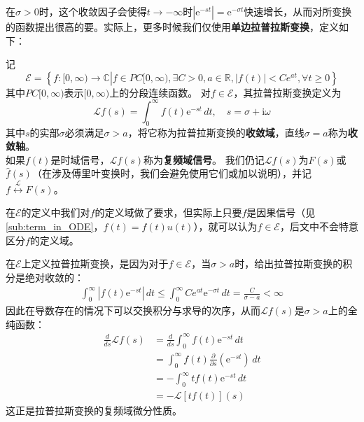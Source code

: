 \documentclass{ctexbook}
\begin{document}
在$\sigma>0$时，这个收敛因子会使得$t\to -\infty$时$|\mathrm{e}^{-st}|=\mathrm{e}^{-\sigma t}$快速增长，从而对所变换的函数提出很高的要。实际上，更多时候我们仅使用\textbf{单边拉普拉斯变换}，定义如下\cite{folland}：
\begin{definition}[单边拉普拉斯变换]
    记\[\mathcal{E}=\left\{f:[0,\infty)\to\mathbb{C}\left|f\in PC[0,\infty),\exists C>0,a\in\mathbb{R},|f(t)|<Ce^{at},\forall t\geq 0\right.\right\}\]
    其中$PC[0,\infty)$表示$[0,\infty)$上的分段连续函数。
    对$f\in\mathcal{E}$，其拉普拉斯变换定义为
    \[\mathcal{L} f(s)=\int_{0}^{\infty}f(t)\mathrm{e}^{-st}\,dt,\quad s=\sigma+\mathrm{i}\omega\]
    其中$s$的实部$\sigma$必须满足$\sigma>a$，将它称为拉普拉斯变换的\textbf{收敛域}，直线$\sigma=a$称为\textbf{收敛轴}。\\
    如果$f(t)$是时域信号，$\mathcal{L} f(s)$称为\textbf{复频域信号}。
    我们仍记$\mathcal{L} f(s)$为$F(s)$或$\hat{f}(s)$（在涉及傅里叶变换时，我们会避免使用它们或加以说明），并记$f\overset{\mathcal{L} }{\longleftrightarrow} F(s)$。
\end{definition}
在$\mathcal{E} $的定义中我们对$f$的定义域做了要求，但实际上只要$f$是因果信号（见\ref{sub:term_in_ODE}，$f(t)=f(t)u(t)$），就可以认为$f\in\mathcal{E}$，后文中不会特意区分$f$的定义域。

在$\mathcal{E} $上定义拉普拉斯变换，是因为对于$f\in\mathcal{E} $，当$\sigma>a$时，给出拉普拉斯变换的积分是绝对收敛的：
\begin{align*}
    \int_0^{\infty}|f(t)\mathrm{e}^{-st}|\,dt\leq \int_0^{\infty}Ce^{at}\mathrm{e}^{-\sigma t}\,dt=\frac{C}{\sigma-a}<\infty
\end{align*}
因此在导数存在的情况下可以交换积分与求导的次序，从而$\mathcal{L} f(s)$是$\sigma>a$上的全纯函数：
\begin{align*}
    \frac{d}{ds}\mathcal{L} f(s)&=\frac{d}{ds}\int_0^{\infty}f(t)\mathrm{e}^{-st}\,dt\\
    &=\int_0^{\infty}f(t)\frac{\partial}{\partial s}(\mathrm{e}^{-st})\,dt\\
    &=-\int_0^{\infty}tf(t)\mathrm{e}^{-st}\,dt\\
    &=-\mathcal{L} [tf(t)](s)
\end{align*}
这正是拉普拉斯变换的复频域微分性质。
\end{document}
